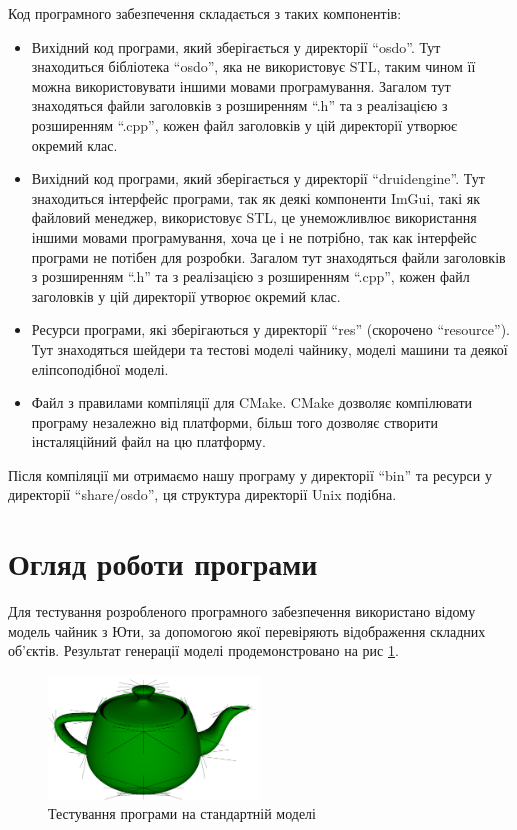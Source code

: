 \let\mypdfximage\pdfximage\def\pdfximage{\immediate\mypdfximage}\documentclass[14pt,a4paper]{extarticle}
\theoremstyle{definition}
\renewcommand{\[}{\begin{singlespace}\begin{equation*}}
\renewcommand{\]}{\end{equation*}\end{singlespace}}
\renewcommand{\+}{\discretionary{\mbox{\scriptsize$\hookleftarrow$}}{}{}}
\begin{document}
Код програмного забезпечення складається з таких компонентів:
\begin{itemize}
\item Вихідний код програми, який зберігається у директорії ``osdo''. Тут знаходиться бібліотека ``osdo'', яка не використовує STL, таким чином її можна використовувати іншими мовами програмування. Загалом тут знаходяться файли заголовків з розширенням ``.h'' та з реалізацією з розширенням ``.cpp'', кожен файл заголовків у цій директорії утворює окремий клас.
\item Вихідний код програми, який зберігається у директорії ``druidengine''. Тут знаходиться інтерфейс програми, так як деякі компоненти ImGui, такі як файловий менеджер, використовує STL, це унеможливлює використання іншими мовами програмування, хоча це і не потрібно, так как інтерфейс програми не потібен для розробки. Загалом тут знаходяться файли заголовків з розширенням ``.h'' та з реалізацією з розширенням ``.cpp'', кожен файл заголовків у цій директорії утворює окремий клас.
\item Ресурси програми, які зберігаються у директорії ``res'' (скорочено ``resource''). Тут знаходяться шейдери та тестові моделі чайнику, моделі машини та деякої еліпсоподібної моделі.
\item Файл з правилами компіляції для CMake. CMake дозволяє компілювати програму незалежно від платформи, більш того дозволяє створити інсталяційний файл на цю платформу.
\end{itemize}

Після компіляції ми отримаємо нашу програму у директорії ``bin'' та ресурси у директорії ``share/osdo'', ця структура директорії Unix подібна.

\section{Огляд роботи програми}

Для тестування розробленого програмного забезпечення використано відому модель чайник з Юти, за допомогою якої перевіряють відображення складних об'єктів.  Результат генерації моделі продемонстровано на рис \ref{fig:testing-teapot}.

\begin{figure}[!htb]
    \centering
    \includegraphics[width=0.5\textwidth]{testing-teapot.png}
    \caption{Тестування програми на стандартній моделі}\label{fig:testing-teapot}
\end{figure}
\end{document}
